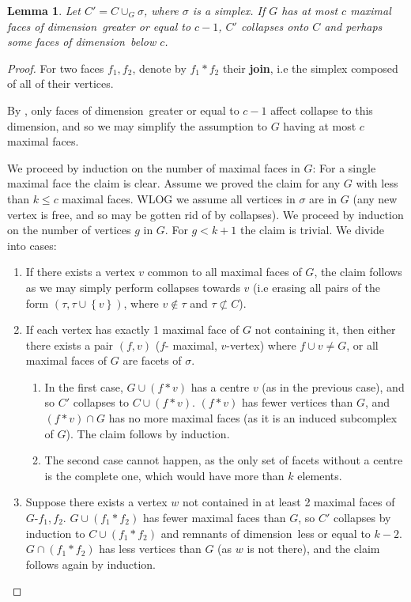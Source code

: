 \documentclass{article}
\newcommand{\crb}[1]{\left\{ #1 \right\}}
\theoremstyle{plain}
\newtheorem{lemma}[theorem]{Lemma}
\theoremstyle{definition}
\theoremstyle{remark}
\newcommand{\di}{dimension}
\begin{document}
\begin{lemma}\label{lem:gluingcollapse}
    Let $C'=C\cup_G \sigma$, where $\sigma$ is a simplex. If $G$ has at most $c$ maximal faces
    of \di\ greater or equal to $c-1$, $C'$ collapses onto $C$ and perhaps some faces of \di\ below $c$.
\end{lemma}
\begin{proof} For two faces $f_1,f_2$, denote by $f_1*f_2$ their \textbf{join}, i.e the simplex composed of all of their vertices.

By , only faces of \di\ greater or equal to $c-1$ affect collapse to this \di, and so we may simplify the assumption to $G$ having at most $c$ maximal faces.\par
    We proceed by induction on the number of maximal faces in $G$: For a single maximal face the claim is clear.
    Assume we proved the claim for any $G$ with less than $k\le c$ maximal faces.
    WLOG we assume all vertices in $\sigma$ are in $G$ (any new vertex is free, and so may be gotten rid of by collapses). We proceed by induction on the number of vertices $g$ in $G$. For $g< k+1$  the claim is trivial. We divide into cases:
    \begin{enumerate}
    \item If there exists a vertex $v$ common to all maximal faces of $G$, the claim follows as we may simply perform collapses towards $v$ (i.e erasing all pairs of the form $(\tau,\tau\cup \crb{v})$, where $v\not\in\tau$ and $\tau\not\subset C$).
        \item If each vertex has exactly 1 maximal face of $G$ not containing it, then either there exists a pair $(f,v)$ ($f$- maximal, $v$-vertex) where $f\cup v \ne G$, or all maximal faces of $G$ are facets of $\sigma$.
    \begin{enumerate}
        \item In the first case, $G\cup (f*v)$ has a centre $v$ (as in the previous case), and so $C'$ collapses to $C\cup (f*v)$. $(f*v)$ has fewer vertices than $G$, and $(f*v)\cap G$ has no more maximal faces (as it is an induced subcomplex of $G$). The claim follows by induction.
    \item  The second case cannot happen, as the only set of facets without a centre is the complete one, which would have more than $k$ elements. \end{enumerate}

    \item Suppose there exists a vertex $w$ not contained in at least 2 maximal faces of $G$-$f_1,f_2$. $G\cup (f_1 *f_2)$ has fewer maximal faces than $G$, so $C'$ collapses by induction to $C\cup (f_1 *f_2)$ and remnants of \di\ less or equal to $k-2$.
    $G\cap (f_1 *f_2)$ has less vertices than $G$ (as $w$ is not there), and the claim follows again by induction. \qedhere
    \end{enumerate}
\end{proof}
\end{document}
